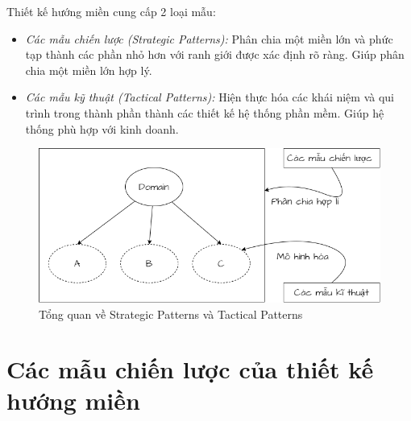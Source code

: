 Thiết kế hướng miền cung cấp 2 loại mẫu:

\begin{itemize}

\item \emph{Các mẫu chiến lược (Strategic Patterns):} Phân chia một miền lớn và phức tạp thành các phần nhỏ hơn với ranh giới được xác định rõ ràng. Giúp phân chia một miền lớn hợp lý.

\item \emph{Các mẫu kỹ thuật (Tactical Patterns):} Hiện thực hóa các khái niệm và qui trình trong thành phần thành các thiết kế hệ thống phần mềm. Giúp hệ thống phù hợp với kinh doanh.

\end{itemize}

\begin{figure}[H]

\centering

\includegraphics[scale = 0.5]{pictures/cac_mau_chien_luoc_va_cac_mau_ky_thuat/main.drawio.png}

\caption{Tổng quan về Strategic Patterns và Tactical Patterns}

\end{figure}


\section{Các mẫu chiến lược của thiết kế hướng miền}


